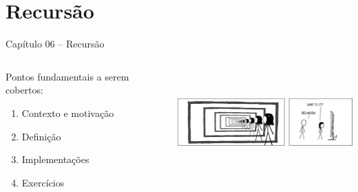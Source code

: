 

\section{Recursão}


\begin{frame}
\begin{center}
{\Large Capítulo 06 -- Recursão}
\end{center}

\begin{columns}
\begin{column}{.4\textwidth}
\centering
Pontos fundamentais a serem cobertos:
  \begin{enumerate}
  \item Contexto e motivação
  \item Definição
  \item Implementações
  \item Exercícios 
\end{enumerate}  
\end{column}

\begin{column}{.6\textwidth}
\centering
\includegraphics[height=4cm, width=7cm]{figs/fig_recursao/cartoon_recursao01.pdf}
\end{column}

\end{columns}


\end{frame}


